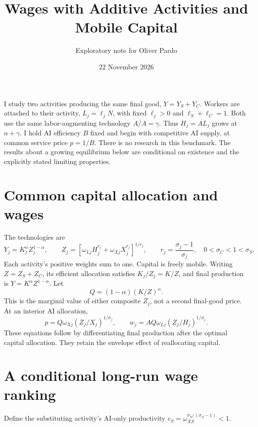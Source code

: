 \documentclass[11pt]{article}
\title{Wages with Additive Activities and Mobile Capital}
\author{Exploratory note for Oliver Pardo}
\date{22 November 2026}
\begin{document}
\maketitle
I study two activities producing the same final good, $Y=Y_S+Y_C$.
Workers are attached to their activity, $L_j=\ell_j N$, with fixed
$\ell_j>0$ and $\ell_S+\ell_C=1$. Both use the same labor-augmenting
technology $\dot A/A=\gamma$. Thus $H_j=AL_j$ grows at $n+\gamma$.
I hold AI efficiency $B$ fixed and begin with competitive AI supply,
at common service price $p=1/B$. There is no research in this benchmark.
The results about a growing equilibrium below are conditional on existence
and the explicitly stated limiting properties.

\section{Common capital allocation and wages}
The technologies are
\[
 Y_j=K_j^\alpha Z_j^{1-\alpha},\qquad
 Z_j=[\omega_{Lj}H_j^{r_j}+\omega_{Xj}X_j^{r_j}]^{1/r_j},\qquad
 r_j=\frac{\sigma_j-1}{\sigma_j},\quad 0<\sigma_C<1<\sigma_S.
\]
Each activity's positive weights sum to one. Capital is freely mobile.
Writing $Z=Z_S+Z_C$, its efficient allocation satisfies
$K_j/Z_j=K/Z$, and final production is $Y=K^\alpha Z^{1-\alpha}$.
Let
\begin{equation}
 Q=(1-\alpha)(K/Z)^\alpha.
 \label{eq:two-Q}
\end{equation}
This is the marginal value of either composite $Z_j$, not a second final-good
price. At an interior AI allocation,
\begin{equation}
 p=Q\omega_{Xj}(Z_j/X_j)^{1/\sigma_j},\qquad
 w_j=A Q\omega_{Lj}(Z_j/H_j)^{1/\sigma_j}.
 \label{eq:two-wages}
\end{equation}
These equations follow by differentiating final production after the optimal
capital allocation. They retain the envelope effect of reallocating capital.

\section{A conditional long-run wage ranking}
Define the substituting activity's AI-only productivity
$c_S=\omega_{XS}^{\sigma_S/(\sigma_S-1)}<1$.
\end{document}
